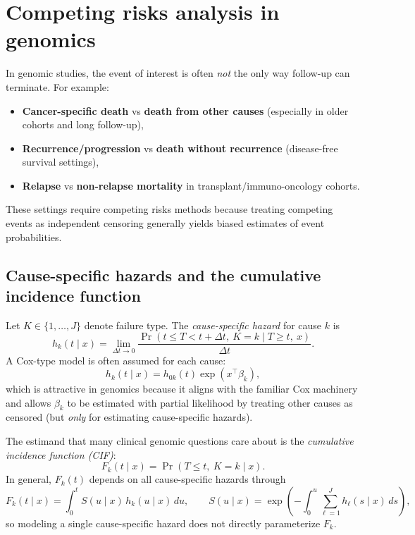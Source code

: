 \documentclass[11pt]{article}
\begin{document}
\section{Competing risks analysis in genomics}
In genomic studies, the event of interest is often \emph{not} the only way follow-up can terminate. For example:
\begin{itemize}
  \item \textbf{Cancer-specific death} vs \textbf{death from other causes} (especially in older cohorts and long follow-up),
  \item \textbf{Recurrence/progression} vs \textbf{death without recurrence} (disease-free survival settings),
  \item \textbf{Relapse} vs \textbf{non-relapse mortality} in transplant/immuno-oncology cohorts.
\end{itemize}
These settings require competing risks methods because treating competing events as independent censoring generally yields biased estimates of event probabilities.

\subsection{Cause-specific hazards and the cumulative incidence function}\label{sec:cause-specific-cif}
Let $K\in\{1,\dots,J\}$ denote failure type. The \emph{cause-specific hazard} for cause $k$ is
\begin{equation}
h_k(t\mid x)=\lim_{\Delta t\rightarrow 0}\frac{\Pr(t\le T<t+\Delta t,\ K=k\mid T\ge t,\ x)}{\Delta t}.
\label{eq:csh}
\end{equation}
A Cox-type model is often assumed for each cause:
\[
h_k(t\mid x)=h_{0k}(t)\exp(x^\top\beta_k),
\]
which is attractive in genomics because it aligns with the familiar Cox machinery and allows \(\beta_k\) to be estimated with partial likelihood by treating other causes as censored (but \emph{only} for estimating cause-specific hazards).

The estimand that many clinical genomic questions care about is the \emph{cumulative incidence function (CIF)}:
\begin{equation}
F_k(t\mid x)=\Pr(T\le t,\ K=k\mid x).
\label{eq:cif}
\end{equation}
In general, \(F_k(t)\) depends on all cause-specific hazards through
\[
F_k(t\mid x)=\int_0^t S(u\mid x)\,h_k(u\mid x)\,du,
\qquad
S(u\mid x)=\exp\!\left(-\int_0^u \sum_{\ell=1}^J h_\ell(s\mid x)\,ds\right),
\]
so modeling a single cause-specific hazard does not directly parameterize \(F_k\).
\end{document}
